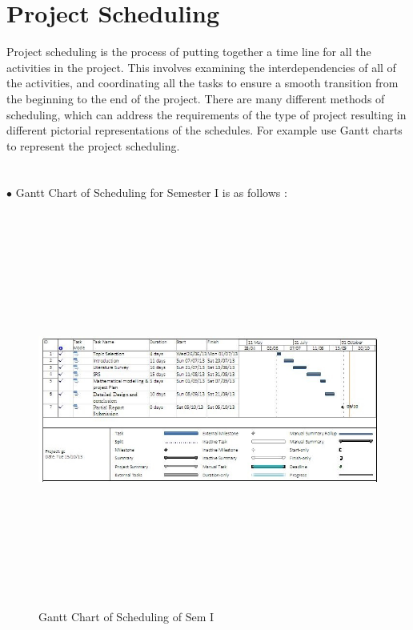 \section{Project Scheduling}
\hspace*{0.7in} Project scheduling is the process of putting together a time line for all the activities in the project. This involves examining the interdependencies of all of the activities, and coordinating all the tasks to ensure a smooth transition from the beginning to the end of the project. There are many different methods of scheduling, which can address the requirements of the type of project resulting in different pictorial representations of the schedules. For example use Gantt charts to represent the project scheduling. \\
\\ \\
$ \bullet $ Gantt Chart of Scheduling for Semester I is as follows : \\
\begin{figure}[h]
\centering
  \includegraphics[width=17cm,height=13cm]{fig34.png}
  \caption{Gantt Chart of Scheduling of Sem I}\label{Gantt Chart of Scheduling Sem I}
\end{figure}

